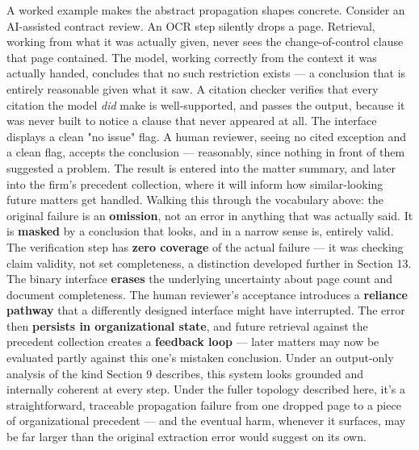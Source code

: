 A worked example makes the abstract propagation shapes concrete. Consider an AI-assisted contract review. An OCR step silently drops a page. Retrieval, working from what it was actually given, never sees the change-of-control clause that page contained. The model, working correctly from the context it was actually handed, concludes that no such restriction exists --- a conclusion that is entirely reasonable given what it saw. A citation checker verifies that every citation the model \emph{did} make is well-supported, and passes the output, because it was never built to notice a clause that never appeared at all. The interface displays a clean "no issue" flag. A human reviewer, seeing no cited exception and a clean flag, accepts the conclusion --- reasonably, since nothing in front of them suggested a problem. The result is entered into the matter summary, and later into the firm's precedent collection, where it will inform how similar-looking future matters get handled. Walking this through the vocabulary above: the original failure is an \textbf{omission}, not an error in anything that was actually said. It is \textbf{masked} by a conclusion that looks, and in a narrow sense is, entirely valid. The verification step has \textbf{zero coverage} of the actual failure --- it was checking claim validity, not set completeness, a distinction developed further in Section 13. The binary interface \textbf{erases} the underlying uncertainty about page count and document completeness. The human reviewer's acceptance introduces a \textbf{reliance pathway} that a differently designed interface might have interrupted. The error then \textbf{persists in organizational state}, and future retrieval against the precedent collection creates a \textbf{feedback loop} --- later matters may now be evaluated partly against this one's mistaken conclusion. Under an output-only analysis of the kind Section 9 describes, this system looks grounded and internally coherent at every step. Under the fuller topology described here, it's a straightforward, traceable propagation failure from one dropped page to a piece of organizational precedent --- and the eventual harm, whenever it surfaces, may be far larger than the original extraction error would suggest on its own.
